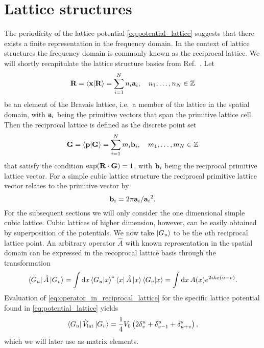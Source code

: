 \section{Lattice structures}

The periodicity of the lattice potential \cref{eq:potential_lattice}
suggests that there exists a finite representation in the frequency domain.
In the context of lattice structures the frequency domain is commonly known
as the reciprocal lattice. We will shortly recapitulate the lattice structure
basics from Ref.~\cite{Roessler2004}. Let
\begin{equation}
  \vb{R}
  =\bra{\vb{x}}\ket{\vb{R}}
  =\sum_{i=1}^Nn_i\vb{a}_i
  \qc n_1,\dots,n_N\in\mathbb{Z}
\end{equation}
be an element of the Bravais lattice, i.e.\ a member of the lattice in the
spatial domain, with $\vb{a}_i$ being the primitive vectors that span the
primitive lattice cell. Then the reciprocal lattice is defined as the discrete
point set
\begin{equation}
  \vb{G}
  =\bra{\vb{p}}\ket{\vb{G}}
  =\sum_{i=1}^Nm_i\vb{b}_i
  \qc m_1,\dots,m_N\in\mathbb{Z}
\end{equation}
that satisfy the condition $\exp(\vb{R}\cdot\vb{G})=1$, with $\vb{b}_i$ being
the reciprocal primitive lattice vector. For a simple cubic lattice structure
the reciprocal primitive lattice vector relates to the primitive vector by
\begin{equation}
  \vb{b}_i
  =2\pi\vb{a}_i/{{\vb{a}_i}^2}.
\end{equation}
For the subsequent sections we will only consider the one dimensional simple
cubic lattice. Cubic lattices of higher dimension, however, can be easily
obtained by superposition of the potentials. We now take $\ket{G_u}$ to be
the $u$th reciprocal lattice point. An arbitrary operator $\hat{A}$ with
known representation in the spatial domain can be expressed in the recoprocal
lattice basis through the transformation
\begin{equation}
  \bra{G_u}\hat{A}\ket{G_v}
  =\int\dd{x}\bra{G_u}\ket{x}^*\bra{x}\hat{A}\ket{x}\bra{G_v}\ket{x}
  =\int\dd{x}A(x)e^{2ikx(u-v)}
  \label{eq:operator_in_reciprocal_lattice}.
\end{equation}
Evaluation of \cref{eq:operator_in_reciprocal_lattice} for the specific
lattice potential found in \cref{eq:potential_lattice} yields
\begin{equation}
  \bra{G_u}\hat{V}_\text{lat}\ket{G_v}
  =\frac{1}{4}V_0\left(2\delta^u_v+\delta^u_{v-1}+\delta^s_{u+v}\right),
  \label{eq:potential_in_reciprocal_lattice}
\end{equation}
which we will later use as matrix elements.

